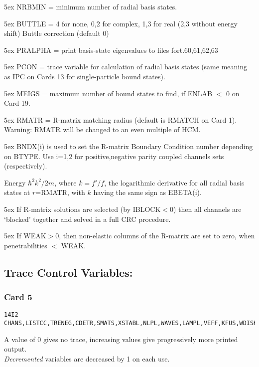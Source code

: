 \documentclass[11pt]{article}
\begin{document}
\hangindent 5ex
NRBMIN = minimum number of radial basis states.

\hangindent 5ex
BUTTLE = 4 for none, 0,2 for complex, 1,3 for real
(2,3 without energy shift) Buttle correction (default 0)

\hangindent 5ex
PRALPHA = print basis-state eigenvalues to files fort.60,61,62,63

\hangindent 5ex
PCON = trace variable for calculation of radial basis states (same
meaning as IPC on Cards 13 for single-particle bound states).

\hangindent 5ex
MEIGS = maximum number of bound states to find, if ENLAB $<$ 0 on Card 19.

\hangindent 5ex
RMATR = R-matrix matching radius (default is RMATCH on Card 1).
Warning: RMATR will be changed to an even multiple of HCM.

\hangindent 5ex
BNDX(i) is used to set the R-matrix Boundary Condition number depending on BTYPE.
Use i=1,2 for positive,negative parity coupled channels sets (respectively).

Energy $\hbar^2k^2/2m$, where $k= f'/f$, the logarithmic derivative
for all radial basis states at $r$=RMATR, with $k$ having the same
sign as EBETA(i). 

\hangindent 5ex
If R-matrix solutions are selected (by IBLOCK$<$0) then all channels
are `blocked' together and solved in a full CRC procedure.

\hangindent 5ex
If WEAK$>$0, then non-elastic columns of the R-matrix are set to zero,
  when penetrabilities $<$ WEAK.

\subsection{Trace Control Variables:}
%
\subsubsection*{Card 5}
\begin{verbatim}
14I2
CHANS,LISTCC,TRENEG,CDETR,SMATS,XSTABL,NLPL,WAVES,LAMPL,VEFF,KFUS,WDISK,BPM,MELFIL,CDCC,NFUS
\end{verbatim}
A value of 0 gives no trace,
increasing values give progressively more printed output.
\\
{\em Decremented} variables are decreased by 1 on each use.

\bigskip
\end{document}
